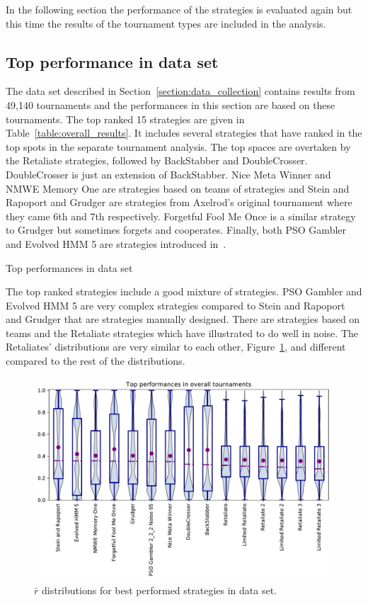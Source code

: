 \documentclass{article}
\begin{document}
In the following section the performance of the strategies is evaluated again
but this time the results of the tournament types are included in the
analysis.

\subsection{Top performance in data set}\label{subsrction:overall}

The data set described in Section~\ref{section:data_collection} contains results
from 49,140 tournaments and the performances in this section are 
based on these tournaments. The top ranked 15 strategies are given in
Table~\ref{table:overall_results}. It includes several strategies that have
ranked in the top spots in the separate tournament analysis.
The top spaces are overtaken by the Retaliate strategies, followed by BackStabber
and DoubleCrosser. DoubleCrosser is just an extension of BackStabber.
Nice Meta Winner and NMWE Memory One are strategies based on teams of strategies
and Stein and Rapoport and Grudger are strategies from Axelrod's original tournament
where they came 6th and 7th respectively. Forgetful Fool Me Once is a similar
strategy to Grudger but sometimes forgets and cooperates. Finally, both
PSO Gambler and Evolved HMM 5 are strategies introduced in~\cite{Harper2017}.

\begin{table}[!htbp]
    \centering
    \resizebox{.35\textwidth}{!}{
    }
    \caption{Top performances in data set}\label{table:overall_results}
\end{table}

The top ranked strategies include a good mixture of strategies. PSO Gambler and
Evolved HMM 5 are very complex strategies compared to Stein and Rapoport and
Grudger that are strategies manually designed. There are strategies based on
teams and the Retaliate strategies which have illustrated to do well in noise.
The Retaliates' distributions are very similar to each other,
Figure~\ref{fig:overall_results}, and different compared to the rest of the
distributions.

\begin{figure}[!htbp]
    \centering
    \includegraphics[width=.8\textwidth]{../images/performance_merged.pdf}
    \caption{\(\bar{r}\) distributions for best performed strategies in data set.}
    \label{fig:overall_results}
\end{figure}
\end{document}
